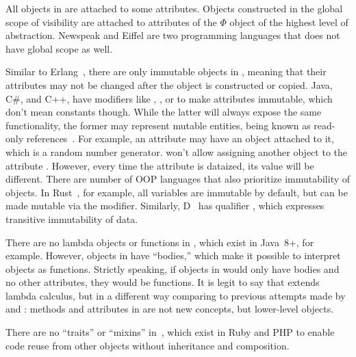 %
All objects in \eolang{} are attached to some attributes. Objects constructed
in the global scope of visibility are attached to attributes of the
\(\Phi\) object of the highest level of abstraction.
Newspeak and Eiffel are two programming languages that does not have global scope as well.

%
Similar to Erlang~\citep{armstrong2010erlang},
there are only immutable objects in \eolang{}, meaning that their attributes may
not be changed after the object is constructed or copied.
Java, C\#, and C++, have modifiers like
, , or  to make attributes immutable, which
don't mean constants though. While the latter will
always expose the same functionality, the former may represent mutable
entities, being known as read-only references~\citep{birka2004practical}.
For example, an attribute  may have an object 
attached to it, which is a random number generator. \eolang{} won't allow
assigning another object to the attribute . However, every time
the attribute is dataized, its value will be different.
%
There are number of OOP languages that also prioritize immutability of objects.
In Rust~\citep{matsakis2014rust}, for example, all variables are immutable by
default, but can be made mutable via the  modifier. Similarly,
D~\citep{bright2020origins} has qualifier , which expresses
transitive immutability of data.

%
There are no lambda objects or functions in \eolang{}, which exist in Java~8+, for example.
However, objects in \eolang{} have ``bodies,'' which make it possible to interpret
objects as functions.
Strictly speaking, if objects in \eolang{} would only have bodies and no other attributes,
they would be functions. It is legit to
say that \eolang{} extends lambda calculus, but in a different way
comparing to previous attempts made by~\citet{mitchell1993lambda} and \citet{di1998lambda}:
methods and attributes in \eolang{} are not new concepts, but lower-level
objects.

%
There are no ``traits'' or ``mixins'' in~\eolang{}, which exist in Ruby and PHP to enable
code reuse from other objects without inheritance and composition.
